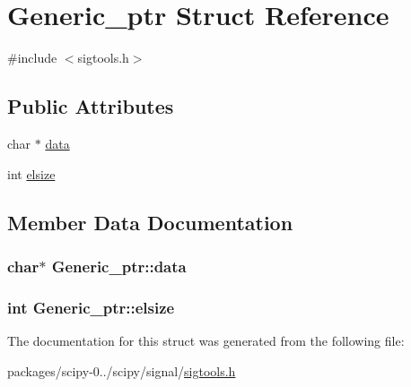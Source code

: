 \hypertarget{structGeneric__ptr}{}\section{Generic\+\_\+ptr Struct Reference}
\label{structGeneric__ptr}


{\ttfamily \#include $<$sigtools.\+h$>$}

\subsection*{Public Attributes}
\begin{DoxyCompactItemize}
\item 
char $\ast$ \hyperlink{structGeneric__ptr_a89d336e95a0e5305acdf919e7254ee2a}{data}
\item 
int \hyperlink{structGeneric__ptr_ab79d2c9c0152b957d6c2dd6d33c25b2c}{elsize}
\end{DoxyCompactItemize}


\subsection{Member Data Documentation}
\hypertarget{structGeneric__ptr_a89d336e95a0e5305acdf919e7254ee2a}{}
\subsubsection[{data}]{\setlength{\rightskip}{0pt plus 5cm}char$\ast$ Generic\+\_\+ptr\+::data}\label{structGeneric__ptr_a89d336e95a0e5305acdf919e7254ee2a}
\hypertarget{structGeneric__ptr_ab79d2c9c0152b957d6c2dd6d33c25b2c}{}
\subsubsection[{elsize}]{\setlength{\rightskip}{0pt plus 5cm}int Generic\+\_\+ptr\+::elsize}\label{structGeneric__ptr_ab79d2c9c0152b957d6c2dd6d33c25b2c}


The documentation for this struct was generated from the following file\+:\begin{DoxyCompactItemize}
\item 
packages/scipy-\/0../scipy/signal/\hyperlink{sigtools_8h}{sigtools.\+h}\end{DoxyCompactItemize}
